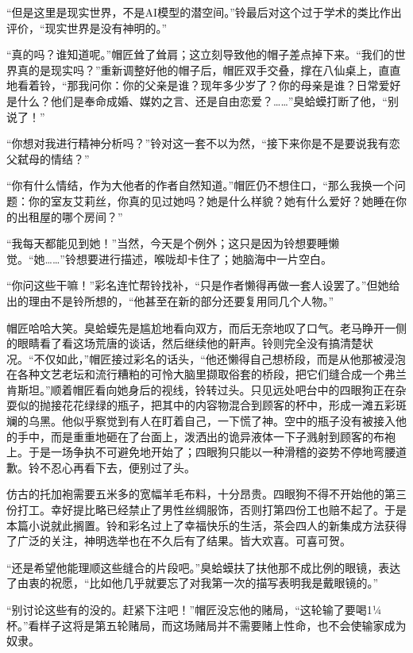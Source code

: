“但是这里是现实世界，不是AI模型的潜空间。”铃最后对这个过于学术的类比作出评价，“现实世界是没有神明的。”

“真的吗？谁知道呢。”帽匠耸了耸肩；这立刻导致他的帽子差点掉下来。“我们的世界真的是现实吗？”重新调整好他的帽子后，帽匠双手交叠，撑在八仙桌上，直直地看着铃，“那我问你：你的父亲是谁？现年多少岁了？你的母亲是谁？日常爱好是什么？他们是奉命成婚、媒妁之言、还是自由恋爱？……”臭蛤蟆打断了他，“别说了！”

“你想对我进行精神分析吗？”铃对这一套不以为然，“接下来你是不是要说我有恋父弑母的情结？”

“你有什么情结，作为大他者的作者自然知道。”帽匠仍不想住口，“那么我换一个问题：你的室友艾莉丝，你真的见过她吗？她是什么样貌？她有什么爱好？她睡在你的出租屋的哪个房间？”

“我每天都能见到她！”当然，今天是个例外；这只是因为铃想要睡懒觉。“她……”铃想要进行描述，喉咙却卡住了；她脑海中一片空白。

“你问这些干嘛！”彩名连忙帮铃找补，“只是作者懒得再做一套人设罢了。”但她给出的理由不是铃所想的，“他甚至在新的部分还要复用同几个人物。”

帽匠哈哈大笑。臭蛤蟆先是尴尬地看向双方，而后无奈地叹了口气。老马睁开一侧的眼睛看了看这场荒唐的谈话，然后继续他的鼾声。铃则完全没有搞清楚状况。“不仅如此，”帽匠接过彩名的话头，“他还懒得自己想桥段，而是从他那被浸泡在各种文艺老坛和流行糟粕的可怜大脑里撷取俗套的桥段，把它们缝合成一个弗兰肯斯坦。”顺着帽匠看向她身后的视线，铃转过头。只见远处吧台中的四眼狗正在杂耍似的抛接花花绿绿的瓶子，把其中的内容物混合到顾客的杯中，形成一滩五彩斑斓的乌黑。他似乎察觉到有人在盯着自己，一下慌了神。空中的瓶子没有被接入他的手中，而是重重地砸在了台面上，泼洒出的诡异液体一下子溅射到顾客的布袍上。于是一场争执不可避免地开始了；四眼狗只能以一种滑稽的姿势不停地弯腰道歉。铃不忍心再看下去，便别过了头。

\begin{branch}
\gutend 仿古的托加袍需要五米多的宽幅羊毛布料，十分昂贵。四眼狗不得不开始他的第三份打工。幸好提比略已经禁止了男性丝绸服饰，否则打第四份工也赔不起了。于是本篇小说就此搁置。铃和彩名过上了幸福快乐的生活，茶会四人的新集成方法获得了广泛的关注，神明选举也在不久后有了结果。皆大欢喜。可喜可贺。
\end{branch}

“还是希望他能理顺这些缝合的片段吧。”臭蛤蟆扶了扶他那不成比例的眼镜，表达了由衷的祝愿，“比如他几乎就要忘了对我第一次的描写表明我是戴眼镜的。”

“别讨论这些有的没的。赶紧下注吧！”帽匠没忘他的赌局，“这轮输了要喝1¼杯。”看样子这将是第五轮赌局，而这场赌局并不需要赌上性命，也不会使输家成为奴隶。

